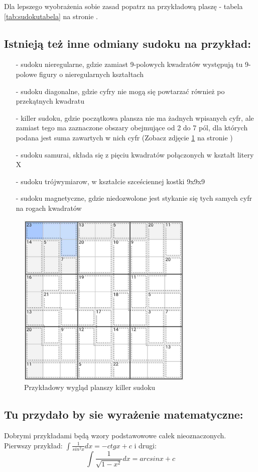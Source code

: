 Dla lepszego wyobrażenia sobie zasad popatrz na przykładową plaszę - tabela \ref{tab:sudokutabela} na stronie \pageref{tab:sudokutabela}.



\subsection{Istnieją też inne odmiany sudoku na przykład:}
    \begin{itemize}
        \item[-]sudoku nieregularne, gdzie zamiast 9-polowych kwadratów występują tu 9-polowe figury o nieregularnych kształtach
        \item[-]sudoku diagonalne, gdzie cyfry nie mogą się powtarzać również po przekątnych kwadratu
        \item[-]killer sudoku, gdzie początkowa plansza nie ma żadnych wpisanych cyfr, ale zamiast tego ma zaznaczone obszary obejmujące od 2 do 7 pól, dla których podana jest suma zawartych w nich cyfr (Zobacz zdjęcie \ref{fig:sudokuprzyklad} na stronie \pageref{fig:sudokuprzyklad})
        \item[-]sudoku samurai, składa się z pięciu kwadratów połączonych w kształt litery X 
        \item[-]sudoku trójwymiarow, w kształcie szceściennej kostki 9x9x9 
        \item[-]sudoku magnetyczne, gdzie niedozwolone jest stykanie się tych samych cyfr na rogach kwadratów
    \end{itemize}

\begin{figure}[htbp]
    \centering
    \includegraphics[width=0.75\textwidth]{pictures/sudokuprzyklad.jpg}
    \caption{Przykładowy wygląd planszy killer sudoku}
    \label{fig:sudokuprzyklad}
\end{figure} 

\subsection{Tu przydało by sie wyrażenie matematyczne:}
Dobrymi przykładami będą wzory podstawowowe całek nieoznaczonych. \\Pierwszy przykład: \( \int \frac{1}{sin^2 x}dx = -ctg x +c \) i drugi: 
\begin{equation}
    \int \frac{1}{\sqrt{1-x^2}}dx = arcsin x+c
\end{equation}

